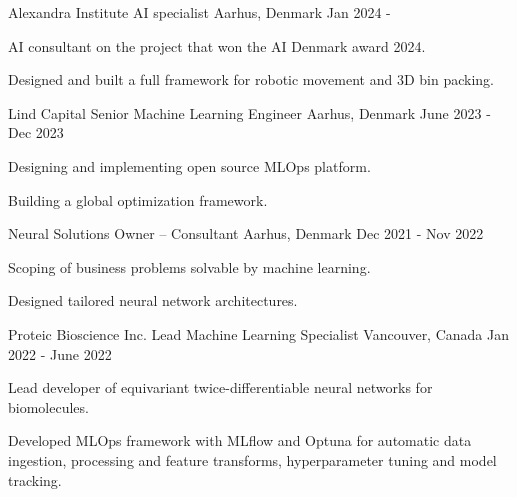 \begin{cventries}
\vspace{5mm}

  \cventry
  {Alexandra Institute} %
  {AI specialist} %
    {Aarhus, Denmark} %
    {Jan 2024 - } %
    {
      \begin{cvitems} %
        \item {AI consultant on the project that won the AI Denmark award 2024.}
        \item {Designed and built a full framework for robotic movement and 3D bin packing.}
      \end{cvitems}
    }


  \cventry
  {Lind Capital} %
  {Senior Machine Learning Engineer} %
    {Aarhus, Denmark} %
    {June 2023 - Dec 2023} %
    {
      \begin{cvitems} %
        \item {Designing and implementing open source MLOps platform.}
        \item {Building a global optimization framework.}
      \end{cvitems}
    }


  \cventry
  {Neural Solutions} %
  {Owner -- Consultant} %
    {Aarhus, Denmark} %
    {Dec 2021 - Nov 2022} %
    {
      \begin{cvitems} %
        \item {Scoping of business problems solvable by machine learning.}
        \item {Designed tailored neural network architectures.}
      \end{cvitems}
    }


  \cventry
  {Proteic Bioscience Inc.} %
  {Lead Machine Learning Specialist} %
    {Vancouver, Canada} %
    {Jan 2022 - June 2022} %
    {
      \begin{cvitems} %
        \item {Lead developer of equivariant twice-differentiable neural networks for biomolecules.}
        \item {Developed MLOps framework with MLflow and Optuna for automatic data ingestion, processing and feature transforms, hyperparameter tuning and model tracking.}
      \end{cvitems}
    }


\end{cventries}
